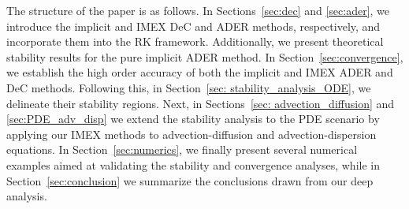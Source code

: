 The structure of the paper is as follows. In Sections~\ref{sec:dec} and \ref{sec:ader}, we introduce the implicit and IMEX DeC and ADER methods, respectively, and incorporate them into the RK framework. Additionally, we present theoretical stability results for the pure implicit ADER method.
In Section~\ref{sec:convergence}, we establish the high order accuracy of both the implicit and IMEX ADER and DeC methods. Following this, in Section~\ref{sec: stability_analysis_ODE}, we delineate their stability regions.
Next, in Sections~\ref{sec: advection_diffusion} and \ref{sec:PDE_adv_disp} we extend the stability analysis to the PDE scenario by applying our IMEX methods to advection-diffusion and advection-dispersion equations.
In Section~\ref{sec:numerics}, we finally present several numerical examples aimed at validating the stability and convergence analyses, while in Section~\ref{sec:conclusion} we summarize the conclusions drawn from our deep analysis. 

